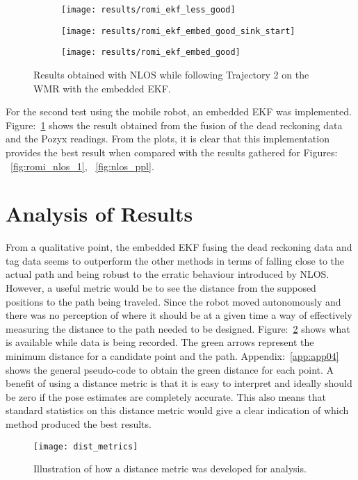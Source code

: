 \begin{figure}[ht!]
    \centering
    \begin{subfigure}{0.6\textwidth}
            \texttt{[image: results/romi\_ekf\_less\_good]}
    \end{subfigure}
    \begin{subfigure}{0.6\textwidth}
            \texttt{[image: results/romi\_ekf\_embed\_good\_sink\_start]}
    \end{subfigure}
    \begin{subfigure}{0.6\textwidth}
            \texttt{[image: results/romi\_ekf\_embed\_good]}
    \end{subfigure}
    \caption{Results obtained with NLOS while following Trajectory 2 on the WMR with the embedded EKF.}
    \label{fig:romi_nlos_ekf}
\end{figure}
For the second test using the mobile robot, an embedded EKF was implemented.
Figure:~\ref{fig:romi_nlos_ekf} shows the result obtained from the fusion of the dead reckoning data and the Pozyx readings.
From the plots, it is clear that this implementation provides the best result when compared with the results gathered for Figures: ~\ref{fig:romi_nlos_1}, ~\ref{fig:nlos_ppl}.


\section{Analysis of Results}\label{sec:analysis-of-results}
From a qualitative point, the embedded EKF fusing the dead reckoning data and tag data seems to outperform the other methods in terms of falling close to the actual path and being robust to the erratic behaviour introduced by NLOS.
However, a useful metric would be to see the distance from the supposed positions to the path being traveled.
Since the robot moved autonomously and there was no perception of where it should be at a given time a way of effectively measuring the distance to the path needed to be designed.
Figure:~\ref{fig:dist} shows what is available while data is being recorded.
The green arrows represent the minimum distance for a candidate point and the path.
Appendix:~\ref{app:app04} shows the general pseudo-code to obtain the green distance for each point.
A benefit of using a distance metric is that it is easy to interpret and ideally should be zero if the pose estimates are completely accurate.
This also means that standard statistics on this distance metric would give a clear indication of which method produced the best results.
\begin{figure}[ht!]
    \centering
    \texttt{[image: dist\_metrics]}
    \caption{Illustration of how a distance metric was developed for analysis.}
    \label{fig:dist}
\end{figure}


